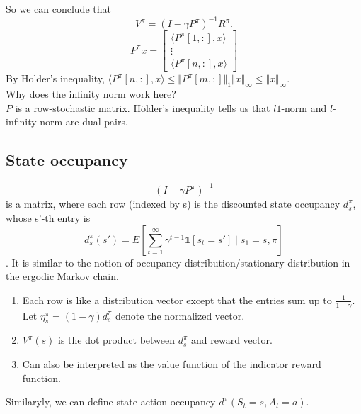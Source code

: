 \documentclass{report}
\begin{document}
So we can conclude that 
\begin{equation}
    V^{\pi}=(I-\gamma P^{\pi})^{-1}R^{\pi}.
\end{equation}
\[
P^{\pi}x= \begin{bmatrix}
\langle P^{\pi}[1,:],x\rangle\\
\vdots\\
\langle P^{\pi}[n,:],x\rangle
\end{bmatrix}
\]
By Holder's inequality, $\langle P^{\pi}[n,:],x\rangle \leq \Vert P^{\pi}[m,:]\Vert_{1}\Vert x\Vert_{\infty} \leq \Vert x\Vert_{\infty}$.\\
Why does the infinity norm work here?\\
$P$ is a row-stochastic matrix. Hölder's inequality tells us that $l1$-norm and $l$-infinity norm are dual pairs.

\subsection{State occupancy}
\[(I-\gamma P^{\pi})^{-1}\] is a matrix, where each row (indexed by s) is the discounted state occupancy $d_s^{\pi}$, whose s'-th entry is \[d_s^{\pi}(s')=E[\sum_{t=1}^{\infty}\gamma^{t-1} \mathbb{1}[s_t=s'] \mid s_1=s,\pi]\]. It is similar to the notion of occupancy distribution/stationary distribution in the ergodic Markov chain.
\begin{enumerate}
    \item Each row is like a distribution vector except that the entries sum up to $\frac{1}{1-\gamma}$. Let $\eta_{s}^{\pi}=(1-\gamma)d_s^{\pi}$ denote the normalized vector.
    \item $V^{\pi}(s)$ is the dot product between $d_s^{\pi}$ and reward vector.
    \item Can also be interpreted as the value function of the indicator reward function.
\end{enumerate}
Similaryly, we can define state-action occupancy $d^{\pi}(S_t=s,A_t=a)$.
\end{document}
